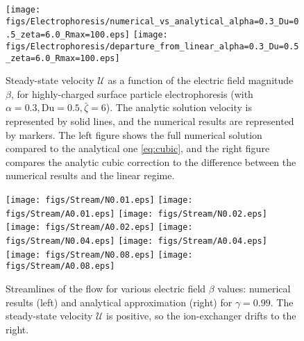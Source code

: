 \documentclass[10pt]{ijnam}
\newcommand\cU{\mathscr{U}}
\begin{document}
\begin{figure}[htbp]
    \begin{center}
    \texttt{[image: figs/Electrophoresis/numerical\_vs\_analytical\_alpha=0.3\_Du=0.5\_zeta=6.0\_Rmax=100.eps]}
    \texttt{[image: figs/Electrophoresis/departure\_from\_linear\_alpha=0.3\_Du=0.5\_zeta=6.0\_Rmax=100.eps]}
        \caption{Steady-state velocity $\cU$ as a function of the 
        electric field magnitude $\beta$, for highly-charged surface particle
        electrophoresis (with $\alpha = 0.3, \text{Du} = 0.5, \bar\zeta = 6$).
        The analytic solution velocity is represented by solid lines, 
        and the numerical results are represented by markers.
        The left figure shows the full numerical solution 
        compared to the analytical one \eqref{eq:cubic}, and
        the right figure compares the analytic cubic correction \cite{schnitzer2012cubic} 
        to the difference between the numerical results and the linear regime.}
	    \label{fig:Electrophoresis}
    \end{center}
\end{figure}

\begin{figure}[htbp]
    \begin{center}
	\texttt{[image: figs/Stream/N0.01.eps]}
	\texttt{[image: figs/Stream/A0.01.eps]}
	\texttt{[image: figs/Stream/N0.02.eps]}
	\texttt{[image: figs/Stream/A0.02.eps]}
	\texttt{[image: figs/Stream/N0.04.eps]}
	\texttt{[image: figs/Stream/A0.04.eps]}
	\texttt{[image: figs/Stream/N0.08.eps]}
	\texttt{[image: figs/Stream/A0.08.eps]}
        \caption{Streamlines of the flow for various electric field $\beta$ values: 
        numerical results (left) and analytical approximation (right) for 
        $\gamma = 0.99$.  The steady-state velocity $\cU$ is positive, so the
        ion-exchanger drifts to the right. 
        }
    \label{fig:Vortex}
    \end{center}
\end{figure}




\end{document}
